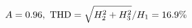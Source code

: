 \documentclass[preview]{standalone}
\begin{document}
\begin{align*}
\special{dvisvgm:raw <g id='unique000'>}A=0.96,\ \text{THD}=\sqrt{H_2^2+H_3^2}/H_1=16.9\%\special{dvisvgm:raw </g>}
\end{align*}
\end{document}
